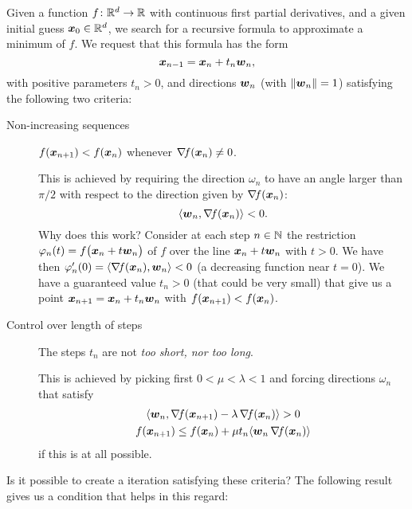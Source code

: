 Given a function $f \colon \mathbb{R}^d \to \mathbb{R}$ with continuous first partial derivatives, and a given initial guess $\boldsymbol{x}_0 \in \mathbb{R}^d$, we search for a recursive formula to approximate a minimum of $f$.  We request that this formula has the form
\begin{equation*}
\boldsymbol{x}_{n-1} = \boldsymbol{x}_n + t_n \boldsymbol{w}_n,
\end{equation*}
with positive parameters $t_n > 0$, and directions $\boldsymbol{w}_n$ (with $\lVert \boldsymbol{w}_n \rVert=1$) satisfying the following two criteria:
\begin{description}
	\item[Non-increasing sequences] $f(\boldsymbol{x}_{n+1}) < f(\boldsymbol{x}_n)$ whenever $\mathop{\nabla\! {f}}(\boldsymbol{x}_n) \neq 0$. 

	\noindent This is achieved by requiring the direction $\omega_n$ to have an angle larger than $\pi/2$ with respect to the direction given by $\mathop{\nabla\! {f}}(\boldsymbol{x}_n)$:
	\begin{equation}
	\langle \boldsymbol{w}_n , \mathop{\nabla\! {f}}(\boldsymbol{x}_n) \rangle < 0.\label{Criterion2}
	\end{equation}
	Why does this work? Consider at each step $n \in \mathbb{N}$ the restriction $\varphi_n(t)=f\big( \boldsymbol{x}_n + t \boldsymbol{w}_n \big)$ of $f$ over the line $\boldsymbol{x}_n + t \boldsymbol{w}_n$ with $t>0$.  We have then $\varphi_n'(0) = \langle \mathop{\nabla\! {f}}(\boldsymbol{x}_n), \boldsymbol{w}_n \rangle < 0$ (a decreasing function near $t=0$).  We have a guaranteed value $t_n > 0$ (that could be very small) that give us a point $\boldsymbol{x}_{n+1} = \boldsymbol{x}_n + t_n \boldsymbol{w}_n$ with $f(\boldsymbol{x}_{n+1}) < f(\boldsymbol{x}_n)$.
	\item[Control over length of steps] The steps $t_n$ are not \emph{too short, nor too long}.

	\noindent This is achieved by picking first $0 < \mu < \lambda < 1$ and forcing directions $\omega_n$ that satisfy
	\begin{gather}
	\langle \boldsymbol{w}_n , \mathop{\nabla\! {f}}(\boldsymbol{x}_{n+1}) - \lambda \mathop{\nabla\! {f}} (\boldsymbol{x}_n) \rangle > 0 \label{Criterion3}\\
	f(\boldsymbol{x}_{n+1}) \leq f(\boldsymbol{x}_n) + \mu t_n \langle \boldsymbol{w}_n \mathop{\nabla\! {f}}(\boldsymbol{x}_n) \rangle \label{Criterion4}
	\end{gather}
	if this is at all possible.
\end{description}

\separator

Is it possible to create a iteration satisfying these criteria?  The following result gives us a condition that helps in this regard:

